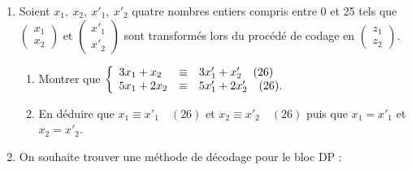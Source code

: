 \documentclass[10pt]{article}
\begin{document}
\medskip

\begin{enumerate}
\item Soient $x_{1},\:x_{2},\:x'_{1},\:x'_{2}$ quatre nombres entiers compris entre 0 et 25 tels que $\begin{pmatrix}x_{1}\\x_{2}\end{pmatrix}$ et $\begin{pmatrix}x'_{1}\\x'_{2}\end{pmatrix}$ sont transformés lors du procédé de codage en $\begin{pmatrix}z_{1}\\z_{2}\end{pmatrix}$. 	
	\begin{enumerate}
		\item Montrer que $\left\{\begin{array}{l c l}
		3x_{1}+ x_{2} & \equiv& 3x'_{1} + x'_{2}  \quad (26)\\
5x_{1}+ 2x_{2}&\equiv&5x'_{1} + 2x'_{2} \quad (26).
\end{array}\right.$ 
		\item En déduire que $x_{1} \equiv  x'_{1}\quad  (26)$ et $x_{2} \equiv  x'_{2} \quad (26)$ puis que $x_{1} = x'_{1}$ et $x_{2} = x'_{2}$.
	\end{enumerate} 
\item On souhaite trouver une méthode de décodage pour le bloc DP : 
\end{enumerate}
\end{document}
